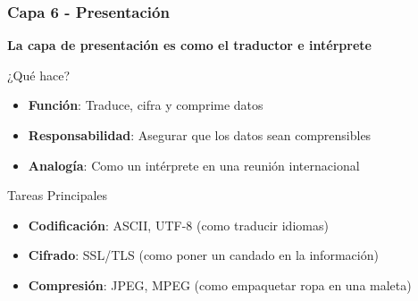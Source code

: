 \documentclass[aspectratio=169]{beamer}
\begin{document}
            \begin{frame}
            \frametitle{Capa 6 - Presentación}
            
            \begin{center}
            \Large \textbf{La capa de presentación es como el traductor e intérprete}
            \end{center}
            
          
            \begin{block}{¿Qué hace?}
            \begin{itemize}
            \item \textbf{Función}: Traduce, cifra y comprime datos
            \item \textbf{Responsabilidad}: Asegurar que los datos sean comprensibles
            \item \textbf{Analogía}: Como un intérprete en una reunión internacional
            \end{itemize}
            \end{block}
            
            \begin{block}{Tareas Principales}
            \begin{itemize}
            \item \textbf{Codificación}: ASCII, UTF-8 (como traducir idiomas)
            \item \textbf{Cifrado}: SSL/TLS (como poner un candado en la información)
            \item \textbf{Compresión}: JPEG, MPEG (como empaquetar ropa en una maleta)
            \end{itemize}
            \end{block}
            
            
            \end{frame}
\end{document}

